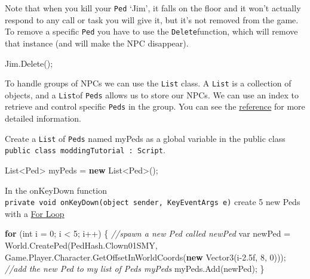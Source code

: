 \documentclass[
  openany]{book}
\newenvironment{Shaded}{\begin{snugshade}}{\end{snugshade}}
\newcommand{\CommentTok}[1]{\textcolor[rgb]{0.56,0.35,0.01}{\textit{#1}}}
\newcommand{\DataTypeTok}[1]{\textcolor[rgb]{0.13,0.29,0.53}{#1}}
\newcommand{\DecValTok}[1]{\textcolor[rgb]{0.00,0.00,0.81}{#1}}
\newcommand{\FloatTok}[1]{\textcolor[rgb]{0.00,0.00,0.81}{#1}}
\newcommand{\FunctionTok}[1]{\textcolor[rgb]{0.00,0.00,0.00}{#1}}
\newcommand{\KeywordTok}[1]{\textcolor[rgb]{0.13,0.29,0.53}{\textbf{#1}}}
\newcommand{\NormalTok}[1]{#1}
\begin{document}
Note that when you kill your \texttt{Ped} `Jim', it falls on the floor and it won't actually respond to any call or task you will give it, but it's not removed from the game. To remove a specific \texttt{Ped} you have to use the \texttt{Delete}function, which will remove that instance (and will make the NPC disappear).

\begin{Shaded}
\begin{Highlighting}[]
\NormalTok{Jim.}\FunctionTok{Delete}\NormalTok{();}
\end{Highlighting}
\end{Shaded}

To handle groups of NPCs we can use the \texttt{List} class. A \texttt{List} is a collection of objects, and a \texttt{List}of \texttt{Peds} allows us to store our NPCs. We can use an index to retrieve and control specific \texttt{Peds} in the group. You can see the \href{https://learn.microsoft.com/en-us/dotnet/api/system.collections.generic.list-1?view=net-7.0}{reference} for more detailed information.

Create a \texttt{List} of \texttt{Peds} named myPeds as a global variable in the public class \texttt{public\ class\ moddingTutorial\ :\ Script}.

\begin{Shaded}
\begin{Highlighting}[]
\NormalTok{List<Ped> myPeds = }\KeywordTok{new}\NormalTok{ List<Ped>();}
\end{Highlighting}
\end{Shaded}

In the onKeyDown function \texttt{private\ void\ onKeyDown(object\ sender,\ KeyEventArgs\ e)} create 5 new Peds with a \href{https://www.w3schools.com/cs/cs_for_loop.php}{For Loop}

\begin{Shaded}
\begin{Highlighting}[]
\KeywordTok{for}\NormalTok{ (}\DataTypeTok{int}\NormalTok{ i = }\DecValTok{0}\NormalTok{; i < }\DecValTok{5}\NormalTok{; i++)}
\NormalTok{\{}
    \CommentTok{//spawn a new Ped called newPed}
    \DataTypeTok{var}\NormalTok{ newPed = World.}\FunctionTok{CreatePed}\NormalTok{(PedHash.}\FunctionTok{Clown01SMY}\NormalTok{, Game.}\FunctionTok{Player}\NormalTok{.}\FunctionTok{Character}\NormalTok{.}\FunctionTok{GetOffsetInWorldCoords}\NormalTok{(}\KeywordTok{new} \FunctionTok{Vector3}\NormalTok{(i}\FloatTok{-2.5f}\NormalTok{, }\DecValTok{8}\NormalTok{, }\DecValTok{0}\NormalTok{)));}
    \CommentTok{//add the new Ped to my list of Peds myPeds}
\NormalTok{    myPeds.}\FunctionTok{Add}\NormalTok{(newPed);}
\NormalTok{\}}
\end{Highlighting}
\end{Shaded}
\end{document}
